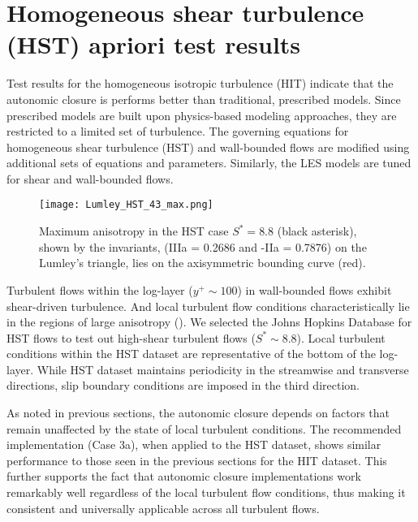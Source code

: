 \section{Homogeneous shear turbulence (HST) apriori test results}
\label{sec:IVHST}

Test results for the homogeneous isotropic turbulence (HIT) indicate that the autonomic closure is performs better than traditional, prescribed models.  Since prescribed models are built upon physics-based modeling approaches, they are restricted to a limited set of turbulence. The governing equations for homogeneous shear turbulence (HST) and wall-bounded flows are modified using additional sets of equations and parameters. Similarly, the LES models are tuned for shear and wall-bounded flows. 

%
\begin{figure}
	\begin{center}
	\texttt{[image: Lumley\_HST\_43\_max.png]}
	\caption{Maximum anisotropy in the HST case $S^* = 8.8$ (black asterisk), shown by the invariants, (IIIa = 0.2686 and -IIa = 0.7876) on the Lumley’s triangle, lies on the axisymmetric bounding curve (red).}
	\label{F:Lumley}
	\end{center}
\end{figure}
%
%

Turbulent flows within the log-layer ($y^+\sim100$) in wall-bounded flows exhibit shear-driven turbulence. And local turbulent flow conditions characteristically lie in the regions of large anisotropy (). We selected the Johns Hopkins Database for HST flows to test out high-shear turbulent flows ($S^*\sim8.8$). Local turbulent conditions within the HST dataset \cite{jhu256} are representative of the bottom of the log-layer. While HST dataset maintains periodicity in the streamwise and transverse directions, slip boundary conditions are imposed in the third direction.

As noted in previous sections, the autonomic closure depends on factors that remain unaffected by the state of local turbulent conditions. The recommended implementation (Case 3a), when applied to the HST dataset, shows similar performance to those seen in the previous sections for the HIT dataset. This further supports the fact that autonomic closure implementations work remarkably well regardless of the local turbulent flow conditions, thus making it consistent and universally applicable across all turbulent flows.


